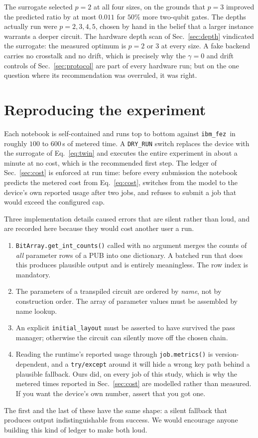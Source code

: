 \documentclass[aps,prx,preprint,superscriptaddress,nofootinbib,longbibliography]{revtex4-2}
\newcommand{\ibmfez}{\texttt{ibm\_fez}}
\begin{document}
The surrogate selected $p=2$ at all four sizes, on the grounds that $p=3$ improved the
predicted ratio by at most $0.011$ for $50\%$ more two-qubit gates. The depths actually run were
$p = 2,3,4,5$, chosen by hand in the belief that a larger instance warrants a deeper circuit. The
hardware depth scan of Sec.~\ref{sec:depth} vindicated the surrogate: the measured optimum is
$p = 2$ or $3$ at every size. A fake backend carries no crosstalk and no drift, which is precisely
why the $\gamma=0$ and drift controls of Sec.~\ref{sec:protocol} are part of every hardware run;
but on the one question where its recommendation was overruled, it was right.

\section{Reproducing the experiment}
\label{app:repro}

Each notebook is self-contained and runs top to bottom against \ibmfez\ in roughly $100$ to
$600\,$s of metered time. A \texttt{DRY\_RUN} switch replaces the device with the surrogate of
Eq.~\eqref{eq:twin} and executes the entire experiment in about a minute at no cost, which is
the recommended first step. The ledger of Sec.~\ref{sec:cost} is enforced at run time: before
every submission the notebook predicts the metered cost from Eq.~\eqref{eq:cost}, switches
from the model to the device's own reported usage after two jobs, and refuses to submit a job
that would exceed the configured cap.

Three implementation details caused errors that are silent rather than loud, and are recorded
here because they would cost another user a run.
\begin{enumerate}
\item \texttt{BitArray.get\_int\_counts()} called with no argument merges the counts of
      \emph{all} parameter rows of a PUB into one dictionary. A batched run that does this
      produces plausible output and is entirely meaningless. The row index is mandatory.
\item The parameters of a transpiled circuit are ordered by \emph{name}, not by construction
      order. The array of parameter values must be assembled by name lookup.
\item An explicit \texttt{initial\_layout} must be asserted to have survived the pass manager;
      otherwise the circuit can silently move off the chosen chain.
\item Reading the runtime's reported usage through \texttt{job.metrics()} is version-dependent,
      and a \texttt{try/except} around it will hide a wrong key path behind a plausible fallback.
      Ours did, on every job of this study, which is why the metered times reported in
      Sec.~\ref{sec:cost} are modelled rather than measured. If you want the device's own number,
      assert that you got one.
\end{enumerate}

The first and the last of these have the same shape: a silent fallback that produces output
indistinguishable from success. We would encourage anyone building this kind of ledger to make
both loud.



\end{document}
